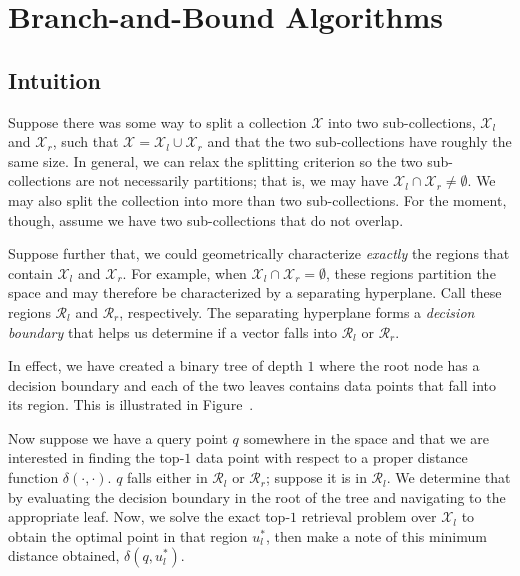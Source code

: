\chapter{Branch-and-Bound Algorithms}
\label{chapter:branch-and-bound}


\section{Intuition}
\label{section:branch-and-bound:intuition}

Suppose there was some way to split a collection $\mathcal{X}$ into
two sub-collections, $\mathcal{X}_l$ and $\mathcal{X}_r$, such that
$\mathcal{X} = \mathcal{X}_l \cup \mathcal{X}_r$ and that the two
sub-collections have roughly the same size. In general, we can relax the splitting
criterion so the two sub-collections are not necessarily partitions; that is,
we may have $\mathcal{X}_l \cap \mathcal{X}_r \neq \emptyset$. We may also
split the collection into more than two sub-collections. For the moment,
though, assume we have two sub-collections that do not overlap.

Suppose further that, we could geometrically characterize \emph{exactly} the regions that contain
$\mathcal{X}_l$ and $\mathcal{X}_r$. For example, when $\mathcal{X}_l \cap \mathcal{X}_r = \emptyset$,
these regions partition the space and may therefore be characterized by a separating hyperplane.
Call these regions $\mathcal{R}_l$ and $\mathcal{R}_r$, respectively.
The separating hyperplane forms a \emph{decision boundary} that helps us determine
if a vector falls into $\mathcal{R}_l$ or $\mathcal{R}_r$.

In effect, we have created a binary tree of depth $1$ where the root node has a decision boundary
and each of the two leaves contains data points that fall into its region.
This is illustrated in Figure~.

Now suppose we have a query point $q$ somewhere in the space and that we are interested
in finding the top-$1$ data point with respect to a proper distance function $\delta(\cdot, \cdot)$.
$q$ falls either in $\mathcal{R}_l$ or $\mathcal{R}_r$;
suppose it is in $\mathcal{R}_l$. We determine that by evaluating the decision boundary in the 
root of the tree and navigating to the appropriate leaf.
Now, we solve the exact top-$1$ retrieval problem over $\mathcal{X}_l$
to obtain the optimal point in that region $u_l^\ast$, then make a note of this minimum distance obtained,
$\delta(q, u_l^\ast)$.

